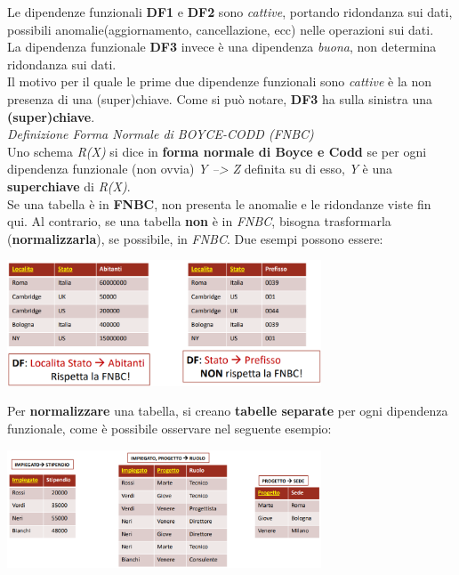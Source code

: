 \documentclass{article}
\begin{document}
Le dipendenze funzionali \textbf{DF1} e \textbf{DF2} sono \textit{cattive}, portando ridondanza sui dati, possibili anomalie(aggiornamento, cancellazione, ecc) nelle operazioni sui dati.\\
La dipendenza funzionale \textbf{DF3} invece è una dipendenza \textit{buona}, non determina ridondanza sui dati.\vspace{14pt}\\
Il motivo per il quale le prime due dipendenze funzionali sono \textit{cattive} è la non presenza di una (super)chiave. Come si può notare, \textbf{DF3} ha sulla sinistra una \textbf{(super)chiave}.\vspace{14pt}\\
\textit{Definizione Forma Normale di BOYCE-CODD (FNBC)}\\
Uno schema \textit{R(X)} si dice in \textbf{forma normale di Boyce e Codd} se per ogni dipendenza funzionale (non ovvia) \textit{Y --> Z} definita su di esso, \textit{Y} è una \textbf{superchiave} di \textit{R(X)}.\vspace{14pt}\\
Se una tabella è in \textbf{FNBC}, non presenta le anomalie e le ridondanze viste fin qui. Al contrario, se una tabella \textbf{non} è in \textit{FNBC}, bisogna trasformarla (\textbf{normalizzarla}), se possibile, in \textit{FNBC}. Due esempi possono essere:
\begin{center}
    \includegraphics[width=0.7\textwidth]{foto5.png}
\end{center}
Per \textbf{normalizzare} una tabella, si creano \textbf{tabelle separate} per ogni dipendenza funzionale, come è possibile osservare nel seguente esempio:
\begin{center}
    \includegraphics[width=0.7\textwidth]{foto6.png}
\end{center}
\end{document}
